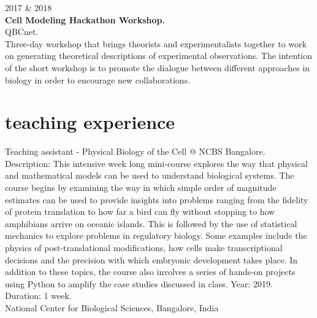 \documentclass[]{friggeri-cv}
\begin{document}
{\small{} 2017 \& 2018 }\\
\textbf{Cell Modeling Hackathon Workshop.}\\
{QBCnet.}\\
Three-day workshop that brings theorists and experimentalists together to work on generating theoretical descriptions of experimental observations. The intention of the short workshop is to promote the dialogue between different approaches in biology in order to encourage new collaborations.

\section{teaching experience}

Teaching assistant - Physical Biology of the Cell @ NCBS Bangalore.\\
Description: This intensive week long mini-course explores the way that physical and mathematical models can be used to understand biological systems. The course begins by examining the way in which simple order of magnitude estimates can be used to provide insights into problems ranging from the fidelity of protein translation to how far a bird can fly without stopping to how amphibians arrive on oceanic islands. This is followed by the use of statistical mechanics to explore problems in regulatory biology. Some examples include the physics of post-translational modifications, how cells make transcriptional decisions and the precision with which embryonic development takes place. In addition to these topics, the course also involves a series of hands-on projects using Python to amplify the case studies discussed in class.
Year: 2019.\\
Duration: 1 week.\\
{National Center for Biological Sciences, Bangalore, India}\\
\end{document}

